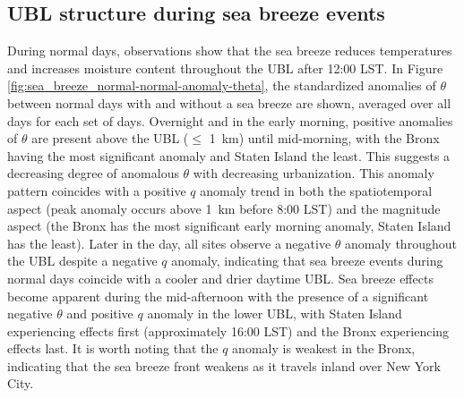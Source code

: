 \documentclass[11pt,a4paper]{article}
\begin{document}
\subsection{UBL structure during sea breeze events}
During normal days, observations show that the sea breeze reduces temperatures and increases moisture content throughout the UBL after 12:00 LST. In Figure \ref{fig:sea_breeze_normal-normal-anomaly-theta}, the standardized anomalies of $\theta$ between normal days with and without a sea breeze are shown, averaged over all days for each set of days. Overnight and in the early morning, positive anomalies of $\theta$ are present above the UBL ($\leq$ \SI{1}{\kilo\meter}) until mid-morning, with the Bronx having the most significant anomaly and Staten Island the least. This suggests a decreasing degree of anomalous $\theta$ with decreasing urbanization. This anomaly pattern coincides with a positive $q$ anomaly trend in both the spatiotemporal aspect (peak anomaly occurs above \SI{1}{\kilo\meter} before 8:00 LST) and the magnitude aspect (the Bronx has the most significant early morning anomaly, Staten Island has the least). Later in the day, all sites observe a negative $\theta$ anomaly throughout the UBL despite a negative $q$ anomaly, indicating that sea breeze events during normal days coincide with a cooler and drier daytime UBL. Sea breeze effects become apparent during the mid-afternoon with the presence of a significant negative $\theta$ and positive $q$ anomaly in the lower UBL, with Staten Island experiencing effects first (approximately 16:00 LST) and the Bronx experiencing effects last. It is worth noting that the $q$ anomaly is weakest in the Bronx, indicating that the sea breeze front weakens as it travels inland over New York City.
\\ \\
\end{document}
